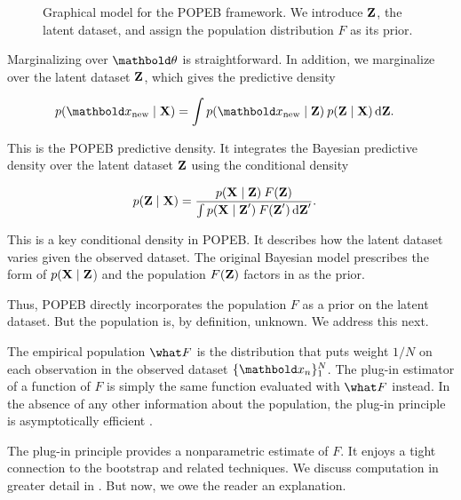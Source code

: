 \begin{figure}[tb]
\centering

\caption{Graphical model for the \gls{POPEB} framework. We introduce $\textbf{Z}$,
the latent dataset, and assign the population distribution $F$ as its prior.}
\label{fig:peb_predictive}
\end{figure}

Marginalizing over $\mbtheta$ is straightforward. In addition, we marginalize
over the latent dataset $\textbf{Z}$, which gives the predictive density
\begin{linenomath}
\begin{align}
  p(\xnew \mid \mbX)
  &=
  \int p(\xnew \mid \mbZ) \: p(\mbZ\mid\mbX)
  \dif\mbZ.
  \label{eq:peb_predictive}
\end{align}
\end{linenomath}
This is the \gls{POPEB} predictive density. It integrates the Bayesian
predictive density over the latent dataset $\textbf{Z}$ using the conditional density
\begin{linenomath}
\begin{align}
  p(\textbf{Z} \mid \textbf{X})
  &=
  \frac{p(\textbf{X}\mid \textbf{Z})\:F(\textbf{Z})}
  {\int p(\textbf{X}\mid \textbf{Z}^\prime)\:F(\textbf{Z}^\prime) \mathop{}\!\mathrm{d}\textbf{Z}^\prime}.
  \label{eq:posterior_X}
\end{align}
\end{linenomath}
This is a key conditional density in \gls{POPEB}. It describes how the
latent dataset varies given the observed dataset. The original Bayesian model
prescribes the form of $p(\textbf{X}\mid\textbf{Z}$) and the population $F(\textbf{Z})$ factors in
as the prior.

Thus, \gls{POPEB} directly incorporates the
population $F$ as a prior on the latent dataset. But the population is, by
definition, unknown. We address this next.

The empirical population $\what F$ is the distribution that
puts weight $1/N$ on each observation in the observed dataset $
\{\mb{x}_n\}_1^N$. The plug-in estimator of a function of $F$ is simply the same
function evaluated with $\what F$ instead.
In the absence of any other information about the population, the plug-in
principle is
asymptotically efficient \citep{efron1994introduction}.

The plug-in principle provides a nonparametric estimate of $F$. It enjoys a
tight connection to the bootstrap and related techniques.
We discuss computation in greater detail in
. But now, we owe the reader an explanation.


